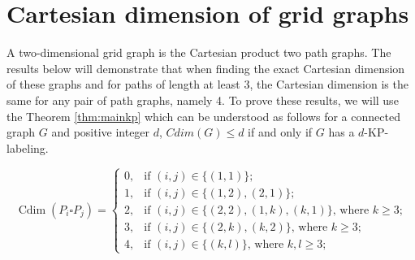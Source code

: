 \documentclass[12pt,a4paper,titlepage,openany]{report}
\DeclareMathOperator{\Cdim}{Cdim}
\begin{document}
\section{Cartesian dimension of grid graphs}
A two-dimensional grid graph is the Cartesian product two path graphs. The results below will demonstrate that when finding the exact Cartesian dimension of these graphs and for paths of length at least 3, the Cartesian dimension is the same for any pair of path graphs, namely 4. To prove these results, we will use the Theorem \ref{thm:mainkp} which can be understood as follows for a connected graph $G$ and positive integer $d$, $Cdim(G) \leq d$ if and only if $G$ has a $d$-KP-labeling.\newline
\begin{theorem}
\[
	\Cdim(P_i \square P_j ) =
		\left\{
			\begin{array}{ll}
				0, & \text{if $(i,j)\in \{(1,1)\}$;} \\
				1, & \text{if $(i,j)\in \{(1,2),(2,1)\}$;} \\
				2, & \text{if $(i,j)\in \{(2,2), (1,k),(k,1)\}$, where $k\geq 3$;} \\
				3, & \text{if $(i,j)\in \{(2,k),(k,2)\}$, where $k\geq 3$;} \\
				4, & \text{if $(i,j)\in \{(k,l)\}$, where $k,l\geq 3$;}
			\end{array}
		\right.
\]
\end{theorem}
\end{document}
